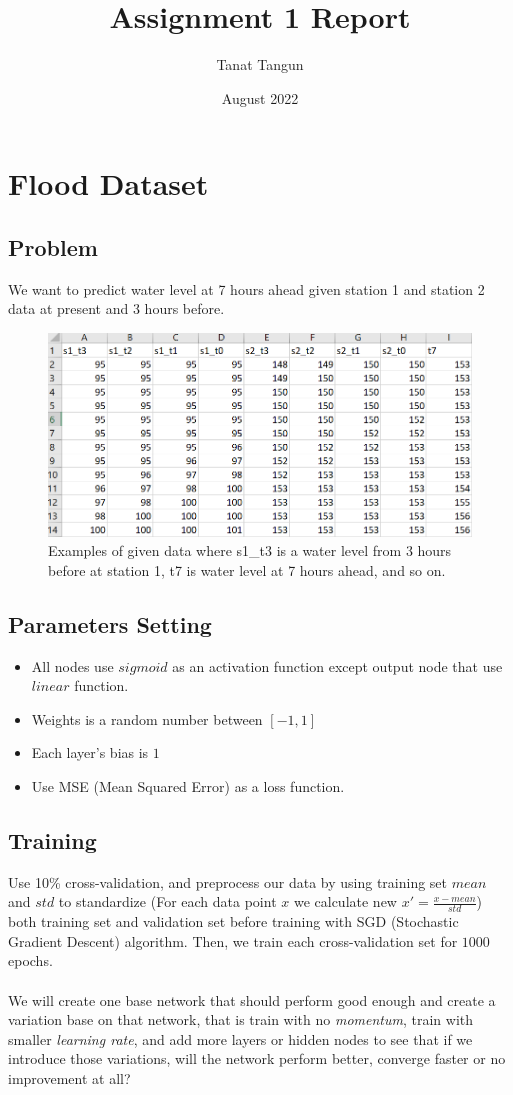 \documentclass{article}
\title{Assignment 1 Report}
\author{Tanat Tangun}
\date{August 2022}
\begin{document}
\maketitle
\section{Flood Dataset}
\subsection*{Problem}
We want to predict water level at 7 hours ahead given station 1 and station 2 data at present and 3 hours before.
\begin{figure}[ht]
	\includegraphics[width=\textwidth]{flood_data}
	\caption{Examples of given data
		where s1\_t3 is a water level from 3 hours before at station 1, t7 is water level at 7 hours ahead, and so on.}
	\centering
\end{figure}

\subsection*{Parameters Setting}
\begin{itemize}
	\item All nodes use $sigmoid$ as an activation function except output node that use $linear$ function.
	\item Weights is a random number between $[-1, 1]$
	\item Each layer's bias is $1$
	\item Use MSE (Mean Squared Error) as a loss function.
\end{itemize}

\subsection*{Training}
Use 10\% cross-validation, and preprocess our data by using training set $mean$ and $std$ to standardize (For each data point $x$ we calculate new $x' = \frac{x - mean}{std}$) both training set and validation set before training with SGD (Stochastic Gradient Descent) algorithm. Then, we train each cross-validation set for $1000$ epochs.
\\ \\
We will create one base network that should perform good enough and create a variation base on that network, that is train with no \emph{momentum}, train with smaller \emph{learning rate}, and add more layers or hidden nodes to see that if we introduce those variations, will the network perform better, converge faster or no improvement at all?
\end{document}
